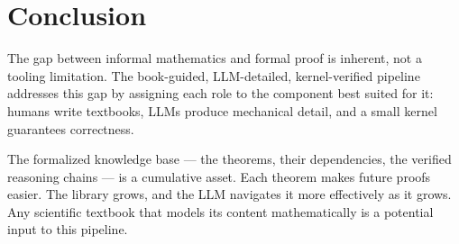 \documentclass[letterpaper]{article}
\begin{document}
\section{Conclusion}
\label{sec:conclusion}

The gap between informal mathematics and formal proof is inherent, not a
tooling limitation. The book-guided, LLM-detailed, kernel-verified pipeline
addresses this gap by assigning each role to the component best suited for
it: humans write textbooks, LLMs produce mechanical detail, and a small
kernel guarantees correctness.

The formalized knowledge base --- the theorems, their dependencies, the
verified reasoning chains --- is a cumulative asset. Each theorem makes
future proofs easier. The library grows, and the LLM navigates it more
effectively as it grows. Any scientific textbook that models its content
mathematically is a potential input to this pipeline.



\end{document}
